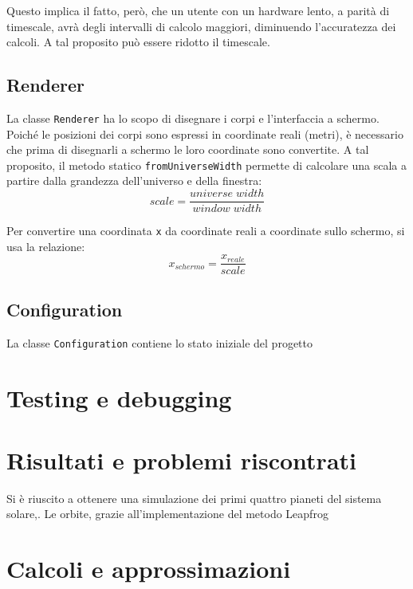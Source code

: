 \documentclass{article}
\begin{document}
Questo implica il fatto, però, che un utente con un hardware lento, a parità di timescale, avrà degli intervalli di calcolo maggiori, diminuendo l'accuratezza dei calcoli. A tal proposito può essere ridotto il timescale.

\subsection{Renderer}
La classe \verb|Renderer| ha lo scopo di disegnare i corpi e l'interfaccia a schermo. Poiché le posizioni dei corpi sono espressi in coordinate reali (metri), è necessario che prima di disegnarli a schermo le loro coordinate sono convertite. A tal proposito, il metodo statico \verb|fromUniverseWidth| permette di calcolare una scala a partire dalla grandezza dell'universo e della finestra:
\begin{equation*}
    scale = \frac{universe\;width}{window\;width}
\end{equation*}

Per convertire una coordinata \verb|x| da coordinate reali a coordinate sullo schermo, si usa la relazione:
\begin{equation*}
    x_{schermo} = \frac{x_{reale}}{scale}
\end{equation*}

\subsection{Configuration}
La classe \verb|Configuration| contiene lo stato iniziale del progetto 

\section{Testing e debugging}

\section{Risultati e problemi riscontrati}
Si è riuscito a ottenere una simulazione dei primi quattro pianeti del sistema solare,. Le orbite, grazie all'implementazione del metodo Leapfrog
\appendix
\section{Calcoli e approssimazioni}
\end{document}
